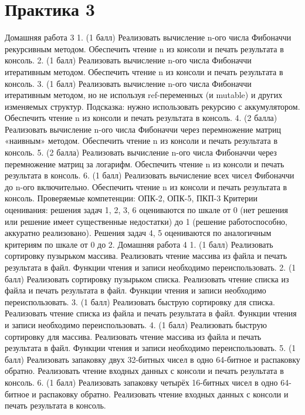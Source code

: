\section{Практика 3}

Домашняя работа 3
    1. (1 балл) Реализовать вычисление n-ого числа Фибоначчи рекурсивным методом. Обеспечить чтение n из консоли и печать результата в консоль.
    2. (1 балл) Реализовать вычисление n-ого числа Фибоначчи итеративным методом. Обеспечить чтение n из консоли и печать результата в консоль.
    3. (1 балл) Реализовать вычисление n-ого числа Фибоначчи итеративным методом, но не используя ref-переменных (и mutable) и других изменяемых структур. Подсказка: нужно использовать рекурсию с аккумулятором. Обеспечить чтение n из консоли и печать результата в консоль.
    4. (2 балла) Реализовать вычисление n-ого числа Фибоначчи через перемножение матриц «наивным» методом. Обеспечить чтение n из консоли и печать результата в консоль.
    5. (2 балла) Реализовать вычисление n-ого числа Фибоначчи через перемножение матриц за логарифм. Обеспечить чтение n из консоли и печать результата в консоль.
    6. (1 балл) Реализовать вычисление всех чисел Фибоначчи до n-ого включительно. Обеспечить чтение n из консоли и печать результата в консоль.
Проверяемые компетенции: ОПК-2, ОПК-5, ПКП-3
Критерии оценивания: решения задач 1, 2, 3, 6 оцениваются по шкале от 0 (нет решения или решение имеет существенные недостатки) до 1 (решение работоспособно, аккуратно реализовано). Решения задач 4, 5 оцениваются по аналогичным критериям по шкале от 0 до 2.
Домашняя работа 4
    1. (1 балл) Реализовать сортировку пузырьком массива. Реализовать чтение массива из файла и печать результата в файл. Функции чтения и записи необходимо переиспользовать.
    2. (1 балл) Реализовать сортировку пузырьком списка. Реализовать чтение списка из файла и печать результата в файл. Функции чтения и записи необходимо переиспользовать.
    3. (1 балл) Реализовать быструю сортировку для списка. Реализовать чтение списка из файла и печать результата в файл. Функции чтения и записи необходимо переиспользовать.
    4. (1 балл) Реализовать быструю сортировку для массива. Реализовать чтение массива из файла и печать результата в файл. Функции чтения и записи необходимо переиспользовать.
    5. (1 балл) Реализовать запаковку двух 32-битных чисел в одно 64-битное и распаковку обратно. Реализовать чтение входных данных с консоли и печать результата в консоль.
    6. (1 балл) Реализовать запаковку четырёх 16-битных чисел в одно 64-битное и распаковку обратно. Реализовать чтение входных данных с консоли и печать результата в консоль.
